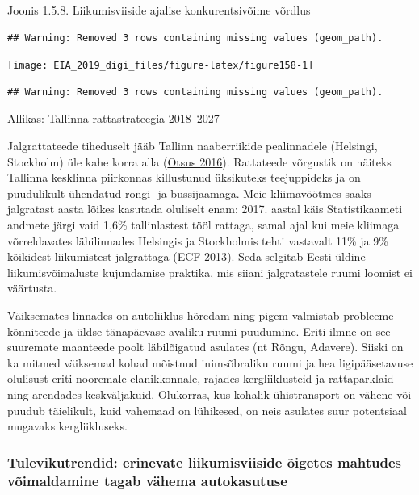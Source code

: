 \documentclass[estonian,]{article}
\begin{document}
{Joonis 1.5.8.} Liikumisviiside ajalise konkurentsivõime võrdlus

\begin{verbatim}
## Warning: Removed 3 rows containing missing values (geom_path).
\end{verbatim}

\begin{center}\texttt{[image: EIA\_2019\_digi\_files/figure-latex/figure158-1]} \end{center}

\begin{verbatim}
## Warning: Removed 3 rows containing missing values (geom_path).
\end{verbatim}

\begin{imgsource}
{Allikas:} Tallinna rattastrateegia 2018--2027
\end{imgsource}

Jalgrattateede tiheduselt jääb Tallinn naaberriikide pealinnadele (Helsingi, Stockholm) üle kahe korra alla (\protect\hyperlink{Otsus2016}{Otsus 2016}). Rattateede võrgustik on näiteks Tallinna kesklinna piirkonnas killustunud üksikuteks teejuppideks ja on puudulikult ühendatud rongi- ja bussijaamaga. Meie kliimavöötmes saaks jalgratast aasta lõikes kasutada oluliselt enam: 2017. aastal käis Statistikaameti andmete järgi vaid 1,6\% tallinlastest tööl rattaga, samal ajal kui meie kliimaga võrreldavates lähilinnades Helsingis ja Stockholmis tehti vastavalt 11\% ja 9\% kõikidest liikumistest jalgrattaga (\protect\hyperlink{EFC2013}{ECF 2013}). Seda selgitab Eesti üldine liikumisvõimaluste kujundamise praktika, mis siiani jalgratastele ruumi loomist ei väärtusta.

Väiksemates linnades on autoliiklus hõredam ning pigem valmistab probleeme kõnniteede ja üldse tänapäevase avaliku ruumi puudumine. Eriti ilmne on see suuremate maanteede poolt läbilõigatud asulates (nt Rõngu, Adavere). Siiski on ka mitmed väiksemad kohad mõistnud inimsõbraliku ruumi ja hea ligipääsetavuse olulisust eriti nooremale elanikkonnale, rajades kergliiklusteid ja rattaparklaid ning arendades keskväljakuid. Olukorras, kus kohalik ühistransport on vähene või puudub täielikult, kuid vahemaad on lühikesed, on neis asulates suur potentsiaal mugavaks kergliikluseks.

\hypertarget{tulevikutrendid-erinevate-liikumisviiside-uxf5igetes-mahtudes-vuxf5imaldamine-tagab-vuxe4hema-autokasutuse}{%
\subsubsection*{Tulevikutrendid: erinevate liikumisviiside õigetes mahtudes võimaldamine tagab vähema autokasutuse}\label{tulevikutrendid-erinevate-liikumisviiside-uxf5igetes-mahtudes-vuxf5imaldamine-tagab-vuxe4hema-autokasutuse}}
\end{document}
